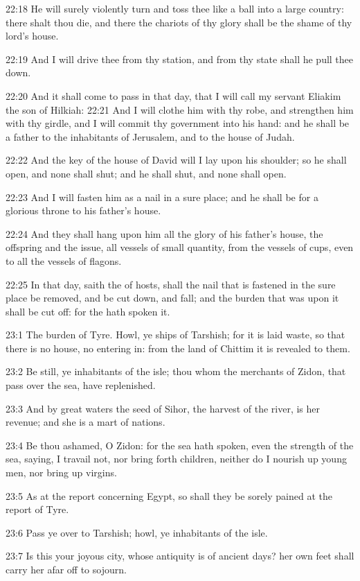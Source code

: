 22:18 He will surely violently turn and toss thee like a ball into a large country: there shalt thou die, and there the chariots of thy glory shall be the shame of thy lord's house.

22:19 And I will drive thee from thy station, and from thy state shall he pull thee down.

22:20 And it shall come to pass in that day, that I will call my servant Eliakim the son of Hilkiah: 22:21 And I will clothe him with thy robe, and strengthen him with thy girdle, and I will commit thy government into his hand: and he shall be a father to the inhabitants of Jerusalem, and to the house of Judah.

22:22 And the key of the house of David will I lay upon his shoulder; so he shall open, and none shall shut; and he shall shut, and none shall open.

22:23 And I will fasten him as a nail in a sure place; and he shall be for a glorious throne to his father's house.

22:24 And they shall hang upon him all the glory of his father's house, the offspring and the issue, all vessels of small quantity, from the vessels of cups, even to all the vessels of flagons.

22:25 In that day, saith the \LORD of hosts, shall the nail that is fastened in the sure place be removed, and be cut down, and fall; and the burden that was upon it shall be cut off: for the \LORD hath spoken it.

23:1 The burden of Tyre. Howl, ye ships of Tarshish; for it is laid waste, so that there is no house, no entering in: from the land of Chittim it is revealed to them.

23:2 Be still, ye inhabitants of the isle; thou whom the merchants of Zidon, that pass over the sea, have replenished.

23:3 And by great waters the seed of Sihor, the harvest of the river, is her revenue; and she is a mart of nations.

23:4 Be thou ashamed, O Zidon: for the sea hath spoken, even the strength of the sea, saying, I travail not, nor bring forth children, neither do I nourish up young men, nor bring up virgins.

23:5 As at the report concerning Egypt, so shall they be sorely pained at the report of Tyre.

23:6 Pass ye over to Tarshish; howl, ye inhabitants of the isle.

23:7 Is this your joyous city, whose antiquity is of ancient days? her own feet shall carry her afar off to sojourn.

